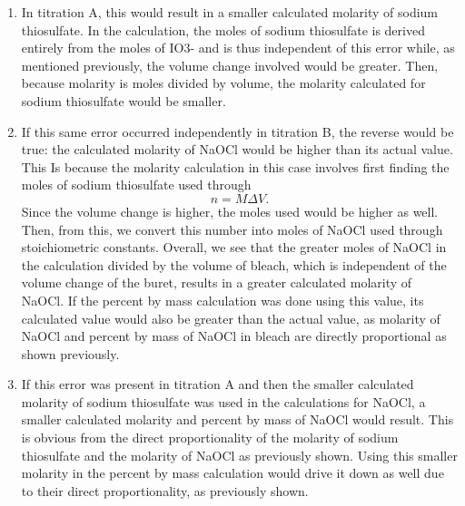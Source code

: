 \documentclass[11pt]{article} %
\begin{document}
\begin{enumerate}
	\begin{enumerate}
		\item In titration A, this would result in a smaller calculated molarity of sodium thiosulfate. In the calculation, the moles of sodium thiosulfate is derived entirely from the moles of IO3- and is thus independent of this error while, as mentioned previously, the volume change involved would be greater. Then, because molarity is moles divided by volume, the molarity calculated for sodium thiosulfate would be smaller.
		\item If this same error occurred independently in titration B, the reverse would be true: the calculated molarity of NaOCl would be higher than its actual value. This Is because the molarity calculation in this case involves first finding the moles of sodium thiosulfate used through $$n = M\Delta V.$$
Since the volume change is higher, the moles used would be higher as well. Then, from this, we convert this number into moles of NaOCl used through stoichiometric constants. Overall, we see that the greater moles of NaOCl in the calculation divided by the volume of bleach, which is independent of the volume change of the buret, results in a greater calculated molarity of NaOCl. If the percent by mass calculation was done using this value, its calculated value would also be greater than the actual value, as molarity of NaOCl and percent by mass of NaOCl in bleach are directly proportional as shown previously.
		\item If this error was present in titration A and then the smaller calculated molarity of sodium thiosulfate was used in the calculations for NaOCl, a smaller calculated molarity and percent by mass of NaOCl would result. This is obvious from the direct proportionality of the molarity of sodium thiosulfate and the molarity of NaOCl as previously shown. Using this smaller molarity in the percent by mass calculation would drive it down as well due to their direct proportionality, as previously shown.

\end{enumerate}
\end{enumerate}
\end{document}
